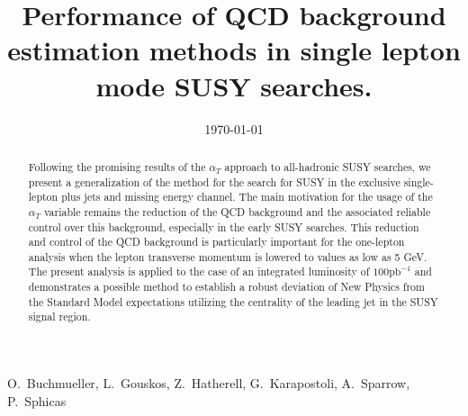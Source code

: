 \documentclass[a4, 12pt]{cmspaper}
\begin{document}

\begin{titlepage}

   \date{\today}

  \title{Performance of QCD background estimation methods in single lepton mode SUSY searches.}

  \begin{Authlist}
   O.~Buchmueller, L.~Gouskos, Z.~Hatherell, G.~Karapostoli, A.~Sparrow, P.~Sphicas
   \end{Authlist}

\begin{abstract}
  Following the promising results of the $\alpha_{T}$ approach to all-hadronic SUSY searches, we present a generalization of the method for the search for SUSY in the exclusive single-lepton plus jets and missing energy channel.
The main motivation for the usage of the $\alpha_T$ variable remains the reduction of the QCD background and the associated reliable control over this background, especially in the early SUSY searches.  This reduction and control of the QCD background is particularly important for the one-lepton analysis when the lepton transverse momentum is lowered to values as low as 5 GeV. The present analysis is applied to the case of an integrated luminosity of $100 \text{pb}^{-1}$ and demonstrates a possible method to establish a robust deviation of New Physics from the Standard Model expectations utilizing the centrality of the leading jet in the SUSY signal region.   
 
\end{abstract}


\end{titlepage}

\tableofcontents

\setcounter{page}{2}%


\end{document}
